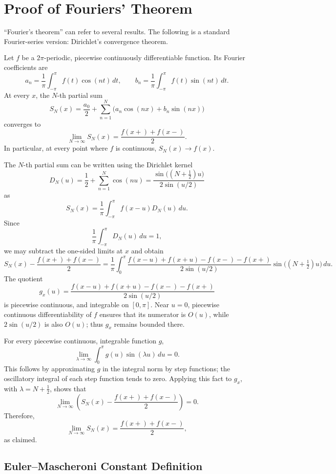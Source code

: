 \documentclass[a4paper, 10pt, onepage]{elegantbook}
\begin{document}
{\section{Proof of Fouriers' Theorem}

“Fourier’s theorem” can refer to several results. The following is a standard Fourier-series version: 
Dirichlet’s convergence theorem.

Let \(f\) be a \(2\pi\)-periodic, piecewise continuously differentiable
function. Its Fourier coefficients are
\[
a_n=\frac{1}{\pi}\int_{-\pi}^{\pi} f(t)\cos(nt)\,dt,
\qquad
b_n=\frac{1}{\pi}\int_{-\pi}^{\pi} f(t)\sin(nt)\,dt.
\]
At every \(x\), the \(N\)-th partial sum
\[
S_N(x)=\frac{a_0}{2}
+\sum_{n=1}^{N}\bigl(a_n\cos(nx)+b_n\sin(nx)\bigr)
\]
converges to
\[
\lim_{N\to\infty}S_N(x)
=\frac{f(x+)+f(x-)}{2}.
\]
In particular, at every point where \(f\) is continuous,
\(S_N(x)\to f(x)\).


The \(N\)-th partial sum can be written using the Dirichlet kernel
\[
D_N(u)=\frac{1}{2}+\sum_{n=1}^{N}\cos(nu)
=\frac{\sin\bigl((N+\tfrac12)u\bigr)}{2\sin(u/2)}
\]
as
\[
S_N(x)=\frac{1}{\pi}\int_{-\pi}^{\pi}f(x-u)D_N(u)\,du.
\]
Since
\[
\frac{1}{\pi}\int_{-\pi}^{\pi}D_N(u)\,du=1,
\]
we may subtract the one-sided limits at \(x\) and obtain
\[
S_N(x)-\frac{f(x+)+f(x-)}{2}
=
\frac{1}{\pi}\int_0^\pi
\frac{f(x-u)+f(x+u)-f(x-)-f(x+)}
     {2\sin(u/2)}
\sin\bigl((N+\tfrac12)u\bigr)\,du.
\]
The quotient
\[
g_x(u)=
\frac{f(x-u)+f(x+u)-f(x-)-f(x+)}
     {2\sin(u/2)}
\]
is piecewise continuous, and integrable on \([0,\pi]\). Near \(u=0\), piecewise continuous differentiability of \(f\) 
ensures that its numerator is \(O(u)\), while \(2\sin(u/2)\) is also \(O(u)\); thus \(g_x\) remains bounded there.

For every piecewise continuous, integrable function \(g\),
\[
\lim_{\lambda\to\infty}\int_0^\pi g(u)\sin(\lambda u)\,du=0.
\]
This follows by approximating \(g\) in the integral norm by step functions; the oscillatory integral of each step 
function tends to zero. Applying this fact to \(g_x\), with
\(\lambda=N+\tfrac12\), shows that
\[
\lim_{N\to\infty}
\left(S_N(x)-\frac{f(x+)+f(x-)}{2}\right)=0.
\]
Therefore,
\[
\lim_{N\to\infty}S_N(x)
=\frac{f(x+)+f(x-)}{2},
\]
as claimed.



\subsection{Euler--Mascheroni Constant Definition}

}
\end{document}
